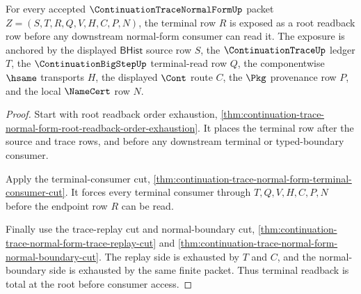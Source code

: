 \begin{theorem}
\label{thm:continuation-trace-normal-form-root-terminal-readback-totality}
For every accepted $\ContinuationTraceNormalFormUp$ packet
$Z=(S,T,R,Q,V,H,C,P,N)$, the terminal row $R$ is exposed as a root readback
row before any downstream normal-form consumer can read it. The exposure is
anchored by the displayed $\mathsf{BHist}$ source row $S$, the
$\ContinuationTraceUp$ ledger $T$, the $\ContinuationBigStepUp$ terminal-read
row $Q$, the componentwise $\hsame$ transports $H$, the displayed $\Cont$
route $C$, the $\Pkg$ provenance row $P$, and the local $\NameCert$ row $N$.
\end{theorem}
\begin{proof}
Start with root readback order exhaustion,
\autoref{thm:continuation-trace-normal-form-root-readback-order-exhaustion}.
It places the terminal row after the source and trace rows, and before any
downstream terminal or typed-boundary consumer.

Apply the terminal-consumer cut,
\autoref{thm:continuation-trace-normal-form-terminal-consumer-cut}. It forces
every terminal consumer through $T,Q,V,H,C,P,N$ before the endpoint row $R$
can be read.

Finally use the trace-replay cut and normal-boundary cut,
\autoref{thm:continuation-trace-normal-form-trace-replay-cut} and
\autoref{thm:continuation-trace-normal-form-normal-boundary-cut}. The replay
side is exhausted by $T$ and $C$, and the normal-boundary side is exhausted
by the same finite packet. Thus terminal readback is total at the root before
consumer access.
\end{proof}

